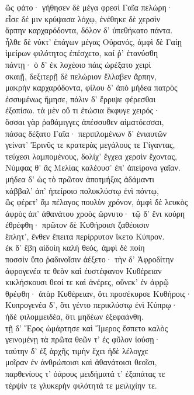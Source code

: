 \begin{pages}
\begin{Leftside}
\quad{}ὣς φάτο· γήθησεν δὲ μέγα φρεσὶ Γαῖα πελώρη· \\
εἷσε δέ μιν κρύψασα λόχῳ, ἐνέθηκε δὲ χερσὶν \\
ἅρπην καρχαρόδοντα, δόλον δ' ὑπεθήκατο πάντα.  \\
ἦλθε δὲ νύκτ' ἐπάγων μέγας Οὐρανός, ἀμφὶ δὲ Γαίῃ\\
ἱμείρων φιλότητος ἐπέσχετο, καί ῥ' ἐτανύσθη\\
πάντῃ· ὁ δ' ἐκ λοχέοιο πάις ὠρέξατο χειρὶ\\
σκαιῇ, δεξιτερῇ δὲ πελώριον ἔλλαβεν ἅρπην,\\
μακρὴν καρχαρόδοντα, φίλου δ' ἀπὸ μήδεα πατρὸς \\
ἐσσυμένως ἤμησε, πάλιν δ' ἔρριψε φέρεσθαι\\
ἐξοπίσω. τὰ μὲν οὔ τι ἐτώσια ἔκφυγε χειρός· \\
ὅσσαι γὰρ ῥαθάμιγγες ἀπέσσυθεν αἱματόεσσαι,\\
πάσας δέξατο Γαῖα· περιπλομένων δ' ἐνιαυτῶν \\
γείνατ' Ἐρινῦς τε κρατερὰς μεγάλους τε Γίγαντας, \\
τεύχεσι λαμπομένους, δολίχ' ἔγχεα χερσὶν ἔχοντας,\\
Νύμφας θ' ἃς Μελίας καλέουσ' ἐπ' ἀπείρονα γαῖαν. \\
μήδεα δ' ὡς τὸ πρῶτον ἀποτμήξας ἀδάμαντι\\
κάββαλ' ἀπ' ἠπείροιο πολυκλύστῳ ἐνὶ πόντῳ,\\
ὣς φέρετ' ἂμ πέλαγος πουλὺν χρόνον, ἀμφὶ δὲ λευκὸς \\
ἀφρὸς ἀπ' ἀθανάτου χροὸς ὤρνυτο· τῷ δ' ἔνι κούρη \\
ἐθρέφθη· πρῶτον δὲ Κυθήροισι ζαθέοισιν \\
ἔπλητ', ἔνθεν ἔπειτα περίρρυτον ἵκετο Κύπρον.\\
ἐκ δ' ἔβη αἰδοίη καλὴ θεός, ἀμφὶ δὲ ποίη\\
ποσσὶν ὕπο ῥαδινοῖσιν ἀέξετο· τὴν δ' Ἀφροδίτην  \\
ἀφρογενέα τε θεὰν καὶ ἐυστέφανον Κυθέρειαν\\
κικλήσκουσι θεοί τε καὶ ἀνέρες, οὕνεκ' ἐν ἀφρῷ\\
θρέφθη· ἀτὰρ Κυθέρειαν, ὅτι προσέκυρσε Κυθήροις· \\
Κυπρογενέα δ', ὅτι γέντο περικλύστῳ ἐνὶ Κύπρῳ·\\
ἠδὲ φιλομμειδέα, ὅτι μηδέων ἐξεφαάνθη. \\
τῇ δ' Ἔρος ὡμάρτησε καὶ Ἵμερος ἔσπετο καλὸς\\
γεινομένῃ τὰ πρῶτα θεῶν τ' ἐς φῦλον ἰούσῃ· \\
ταύτην δ' ἐξ ἀρχῆς τιμὴν ἔχει ἠδὲ λέλογχε\\
μοῖραν ἐν ἀνθρώποισι καὶ ἀθανάτοισι θεοῖσι,\\
παρθενίους τ' ὀάρους μειδήματά τ' ἐξαπάτας τε \\
τέρψίν τε γλυκερὴν φιλότητά τε μειλιχίην τε.\\


\end{Leftside}
\end{pages}
